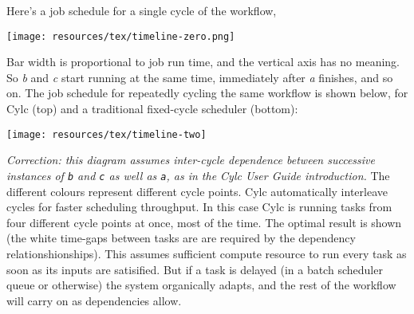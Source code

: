 Here's a job schedule for a single cycle of the workflow,
\begin{center}
    \texttt{[image: resources/tex/timeline-zero.png]}
\end{center}

Bar width is proportional to job run time, and the vertical axis has no
meaning.  So {\em b} and {\em c} start running at the same time,
immediately after {\em a} finishes, and so on.  The job schedule for repeatedly
cycling the same workflow is shown below, for Cylc (top) and a traditional
fixed-cycle scheduler (bottom):

\begin{center}
    \texttt{[image: resources/tex/timeline-two]}
\end{center}
{\em Correction: this diagram assumes inter-cycle dependence between
successive instances of \lstinline=b= and \lstinline=c= as well as
\lstinline=a=, as in the Cylc User Guide introduction.}
The different colours represent different cycle points.  Cylc automatically
interleave cycles for faster scheduling throughput. In this case Cylc is
running tasks from four different cycle points at once, most of the time. The
optimal result is shown (the white time-gaps between tasks are are required by
the dependency relationshionships). This assumes sufficient compute resource to
run every task as soon as its inputs are satisified. But if a task is delayed
(in a batch scheduler queue or otherwise) the system organically adapts, and
the rest of the workflow will carry on as dependencies allow.

